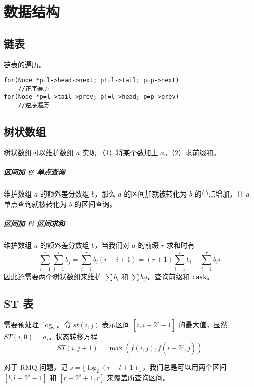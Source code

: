 \chapter{数据结构}

\section{链表}



链表的遍历。

\begin{lstlisting}[style=cpp]
for(Node *p=l->head->next; p!=l->tail; p=p->next)
    //正序遍历
for(Node *p=l->tail->prev; p!=l->head; p=p->prev)
    //逆序遍历
\end{lstlisting}

\section{树状数组}

树状数组可以维护数组 $a$ 实现 （1）将某个数加上 $x$。（2）求前缀和。



\paragraph{区间加 \& 单点查询}

维护数组 $a$ 的额外差分数组 $b$，那么 $a$ 的区间加就被转化为 $b$ 的单点增加，且 $a$ 单点查询就被转化为 $b$ 的区间查询。



\paragraph{区间加 \& 区间求和}

维护数组 $a$ 的额外差分数组 $b$，当我们对 $a$ 的前缀 $r$ 求和时有
$$\sum_{i=1}^r \sum_{j=1}^i b_j = \sum_{i=1}^rb_i(r-i+1) = (r+1)\sum_{i=1}^rb_i - \sum_{i=1}^rb_ii$$
因此还需要两个树状数组来维护 $\sum b_i$ 和 $\sum b_ii$。查询前缀和 \verb|cask|。



\section{ST 表}

需要预处理 $\log_2$。令 $st(i,j)$ 表示区间 $[i,i+2^j-1]$ 的最大值，显然 $ST(i,0)=a_i$。状态转移方程
$$ST(i,j+1) = \max(f(i,j) , f(i+2^{j},j))$$



对于 RMQ 问题，记 $s = \lfloor\log_2(r-l+1)\rfloor$，我们总是可以用两个区间 $[l,l+2^s-1]$ 和 $[r-2^s+1,r]$ 来覆盖所查询区间。

